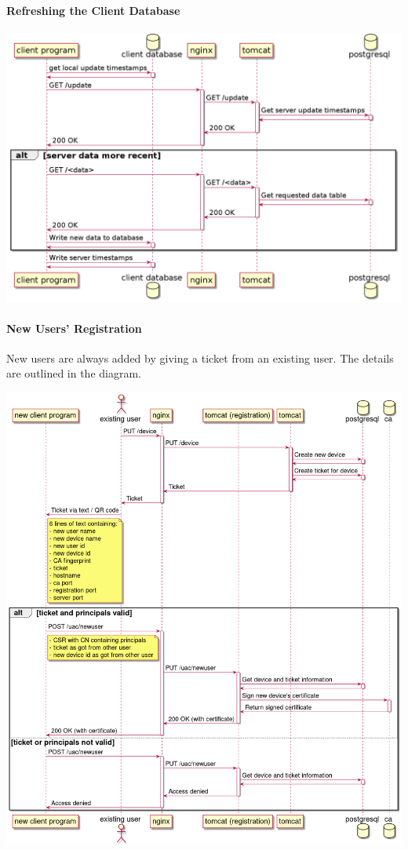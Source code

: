 \documentclass{memoir}
\begin{document}
\paragraph{Refreshing the Client Database\\}

\includegraphics[width=\linewidth]{diagrams/refresh-data.png}

\paragraph{New Users' Registration}
New users are always added by giving a ticket from an existing user. The details are outlined in the diagram.

\includegraphics[width=\linewidth]{diagrams/device-registration.png}
\end{document}
